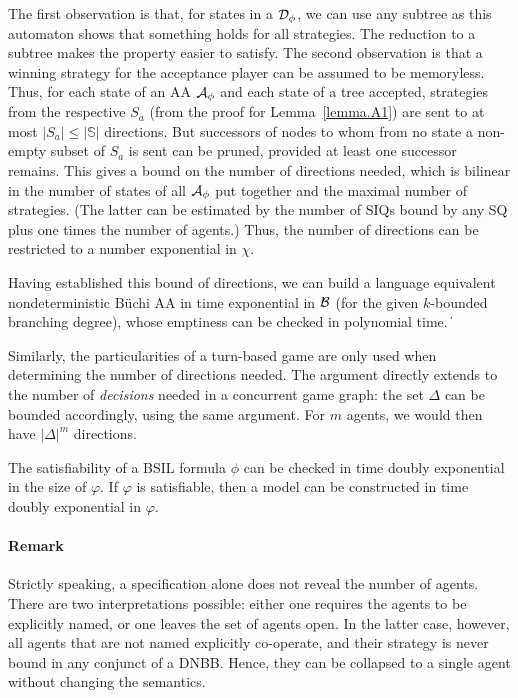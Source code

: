 \documentclass[11pt]{article}
\newcommand{\cala}{{\cal A}}
\newcommand{\calb}{{\cal B}}
\newcommand{\cald}{{\cal D}}
\newcommand{\bbbbs}{{\mathbb S}}
\def\qed{\ifmmode\|\else{\unskip\nobreak\hfil
\penalty50\hskip1em\null\nobreak\hfil$\blacksquare$
\parfillskip=0pt\finalhyphendemerits=0\endgraf}\fi}
\begin{document}
The first observation is that, for states in a $\cald_\phi$, 
we can use any subtree as this automaton shows that something holds 
for all strategies.   
The reduction to a subtree makes the property easier to satisfy.
The second observation is that a winning strategy 
for the acceptance player 
can be assumed to be memoryless.
Thus, for each state of an AA $\cala_\phi$ and each state 
of a tree accepted, strategies from the respective 
$S_a$ (from the proof for Lemma~\ref{lemma.A1}) 
are sent to at most $|S_a| \leq |\bbbbs|$ directions.
But successors of nodes to whom from no state a non-empty subset 
of $S_a$ is sent can be pruned, provided at least one successor remains.
This gives a bound on the number of directions needed, which is bilinear in the number of states of all $\cala_\phi$ put together and the maximal number of strategies.
(The latter can be estimated by the number of SIQs bound by any SQ plus one times the number of agents.)  
Thus, the number of directions can be restricted 
to a number exponential in $\chi$.

Having established this bound of directions, 
we can build a language equivalent nondeterministic B\"uchi AA  
in time exponential in $\calb$ 
(for the given $k$-bounded branching degree), 
whose emptiness can be checked in polynomial time.
\qed

Similarly, the particularities of a turn-based game are only used when determining the number of directions needed.
The argument directly extends to the number of \emph{decisions} needed in a concurrent game graph: the set $\Delta$ can be bounded accordingly, using the same argument.
For $m$ agents, we would then have $|\Delta|^m$ directions.

{\theorem\label{thm.sat.cgg}
The satisfiability of a BSIL formula $\phi$ can be checked in time doubly exponential in the size of $\varphi$.
If $\varphi$ is satisfiable, then a model can be constructed in time doubly exponential in $\varphi$.
}



\paragraph{Remark}
Strictly speaking, a specification alone does not reveal the number of agents. There are two interpretations possible: either one requires the agents to be explicitly named, or one leaves the set of agents open. In the latter case, however, all agents that are not named explicitly co-operate, and their strategy is never bound in any conjunct of a DNBB. Hence, they can be collapsed to a single agent without changing the semantics.
\medskip
\end{document}
